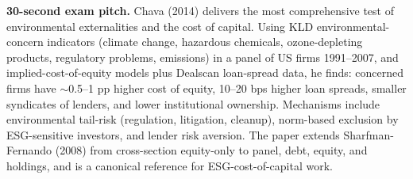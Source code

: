 \documentclass[11pt]{article}
\begin{document}
\begin{keybox}
\textbf{30-second exam pitch.} Chava (2014) delivers the most comprehensive test of environmental externalities and the cost of capital. Using KLD environmental-concern indicators (climate change, hazardous chemicals, ozone-depleting products, regulatory problems, emissions) in a panel of US firms 1991--2007, and implied-cost-of-equity models plus Dealscan loan-spread data, he finds: concerned firms have $\sim$0.5--1 pp higher cost of equity, 10--20 bps higher loan spreads, smaller syndicates of lenders, and lower institutional ownership. Mechanisms include environmental tail-risk (regulation, litigation, cleanup), norm-based exclusion by ESG-sensitive investors, and lender risk aversion. The paper extends Sharfman-Fernando (2008) from cross-section equity-only to panel, debt, equity, and holdings, and is a canonical reference for ESG-cost-of-capital work.
\end{keybox}
\end{document}
